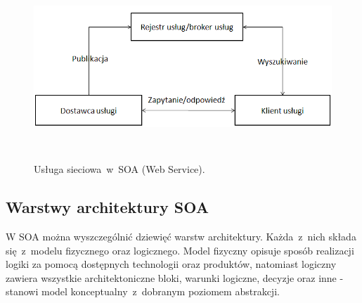 \begin{figure}[h!tbp]
\begin{centering}
\includegraphics[width=13cm, height=7cm]{img/web_service.png}
\caption[Usługa sieciowa~w~SOA (Web Service).]{Usługa sieciowa~w~SOA (Web Service). }\label{WSArchFunc}
\end{centering}
\end{figure}

\subsection{Warstwy architektury SOA}
W SOA można wyszczególnić dziewięć warstw architektury. Każda~z~nich składa się~z~modelu fizycznego oraz logicznego. Model fizyczny opisuje sposób realizacji logiki za pomocą dostępnych technologii oraz produktów, natomiast logiczny zawiera wszystkie architektoniczne bloki, warunki logiczne, decyzje oraz inne - stanowi model konceptualny~z~dobranym poziomem abstrakcji.

